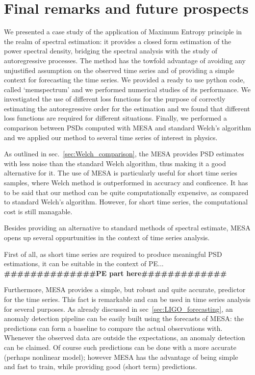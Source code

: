 \documentclass[twocolumn,showpacs,preprintnumbers,nofootinbib,prd,
superscriptaddress,10pt]{revtex4-1}
\begin{document}
\section{Final remarks and future prospects} \label{sec:conclusion}

We presented a case study of the application of Maximum Entropy principle in the realm of spectral estimation: it provides a closed form estimation of the power spectral density, bridging the spectral analysis with the study of autoregressive processes. The method has the towfold advantage of avoiding any unjustified assumption on the observed time series and of providing a simple context for forecasting the time series. We provided a ready to use python code, called `memspectrum' and we performed numerical studies of its performance.
We investigated the use of different loss functions for the purpose of correctly estimating the autoregressive order for the estimation and we found that different loss functions are required for different situations.
Finally, we performed a comparison between PSDs computed with MESA and standard Welch's algorithm and we applied our method to several time series of interest in physics.

As outlined in sec.~\ref{sec:Welch_comparison}, the MESA provides PSD estimates with less noise than the standard Welch algorithm, thus making it a good alternative for it. The use of MESA is particularly useful for short time series samples, where Welch method is outperformed in accuracy and conficence.
It has to be said that our method can be quite computationally expensive, as compared to standard Welch's algorithm. However, for short time series, the computational cost is still managable.

Besides providing an alternative to standard methods of spectral estimate, MESA opens up several oppurtunities in the context of time series analysis.

First of all, as short time series are required to produce meaningful PSD estimations, it can be suitable in the context of PE...
\textbf{##############PE part here#############}

Furthermore, MESA provides a simple, but robust and quite accurate, predictor for the time series. This fact is remarkable and can be used in time series analysis for several purposes.
As already discussed in sec~\ref{sec:LIGO_forecasting}, an anomaly detection pipeline can be easily built using the forecasts of MESA: the predictions can form a baseline to compare the actual observations with. Whenever the observed data are outside the expectations, an anomaly detection can be claimed.
Of course such predictions can be done with a more accurate (perhaps nonlinear model); however MESA has the advantage of being simple and fast to train, while providing good (short term) predictions.
\end{document}

